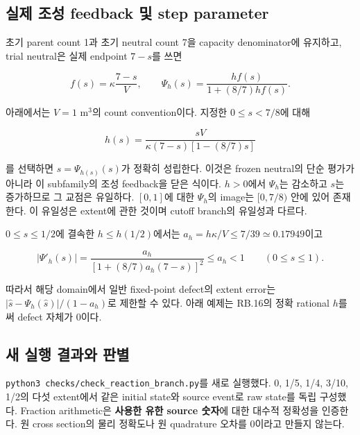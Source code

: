 \hypertarget{uxc2e4uxc81c-uxc870uxc131-feedback-uxbc0f-step-parameter}{%
\subsection{실제 조성 feedback 및 step parameter}\label{uxc2e4uxc81c-uxc870uxc131-feedback-uxbc0f-step-parameter}}

초기 parent count 1과 초기 neutral count 7을 capacity denominator에 유지하고, trial neutral은 실제 endpoint \(7-s\)를 쓰면

\[f(s)=\kappa\frac{7-s}{V},\qquad \Psi_h(s)=\frac{hf(s)}{1+(8/7)hf(s)}.\tag{RB.15}\]

아래에서는 \(V=1\) m\(^3\)의 count convention이다. 지정한 \(0\le s<7/8\)에 대해

\[h(s)=\frac{sV}{\kappa(7-s)[1-(8/7)s]}\tag{RB.16}\]

를 선택하면 \(s=\Psi_{h(s)}(s)\)가 정확히 성립한다. 이것은 frozen neutral의 단순 평가가 아니라 이 subfamily의 조성 feedback을 닫은 식이다. \(h>0\)에서 \(\Psi_h\)는 감소하고 \(s\)는 증가하므로 그 교점은 유일하다. \([0,1]\)에 대한 \(\Psi_h\)의 image는 \([0,7/8)\) 안에 있어 존재한다. 이 유일성은 extent에 관한 것이며 cutoff branch의 유일성과 다르다.

\(0\le s\le1/2\)에 결속한 \(h\le h(1/2)\)에서는 \(a_h=h\kappa/V\le7/39\simeq0.17949\)이고

\[|\Psi'_h(s)|=\frac{a_h}{[1+(8/7)a_h(7-s)]^2}\le a_h<1\qquad(0\le s\le1).\tag{RB.17}\]

따라서 해당 domain에서 일반 fixed-point defect의 extent error는 \(|\widehat s-\Psi_h(\widehat s)|/(1-a_h)\)로 제한할 수 있다. 아래 예제는 RB.16의 정확 rational \(h\)를 써 defect 자체가 0이다.

\hypertarget{uxc0c8-uxc2e4uxd589-uxacb0uxacfcuxc640-uxd310uxbcc4}{%
\subsection{새 실행 결과와 판별}\label{uxc0c8-uxc2e4uxd589-uxacb0uxacfcuxc640-uxd310uxbcc4}}

\nolinkurl{python3 checks/check_reaction_branch.py}를 새로 실행했다. 0, 1/5, 1/4, 3/10, 1/2의 다섯 extent에서 같은 initial state와 source event로 raw state를 독립 구성했다. Fraction arithmetic은 \textbf{사용한 유한 source 숫자}에 대한 대수적 정확성을 인증한다. 원 cross section의 물리 정확도나 원 quadrature 오차를 0이라고 만들지 않는다.


